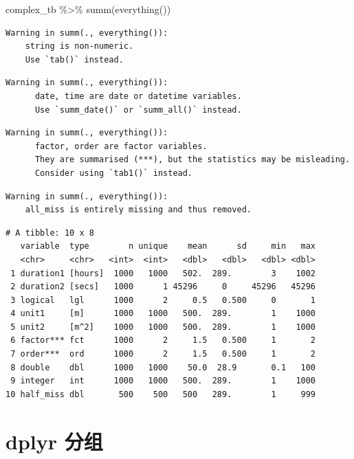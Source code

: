 \documentclass[
  letterpaper,
]{ctexbook}
\newenvironment{Shaded}{\begin{snugshade}}{\end{snugshade}}
\newcommand{\FunctionTok}[1]{\textcolor[rgb]{0.28,0.35,0.67}{#1}}
\newcommand{\NormalTok}[1]{\textcolor[rgb]{0.00,0.23,0.31}{#1}}
\newcommand{\SpecialCharTok}[1]{\textcolor[rgb]{0.37,0.37,0.37}{#1}}
\begin{document}
\begin{Shaded}
\begin{Highlighting}[]
\NormalTok{complex\_tb }\SpecialCharTok{\%\textgreater{}\%}
  \FunctionTok{summ}\NormalTok{(}\FunctionTok{everything}\NormalTok{())}
\end{Highlighting}
\end{Shaded}

\begin{verbatim}
Warning in summ(., everything()): 
    string is non-numeric.
    Use `tab()` instead.
\end{verbatim}

\begin{verbatim}
Warning in summ(., everything()): 
      date, time are date or datetime variables.
      Use `summ_date()` or `summ_all()` instead.
\end{verbatim}

\begin{verbatim}
Warning in summ(., everything()): 
      factor, order are factor variables.
      They are summarised (***), but the statistics may be misleading.
      Consider using `tab1()` instead.
\end{verbatim}

\begin{verbatim}
Warning in summ(., everything()): 
    all_miss is entirely missing and thus removed.
\end{verbatim}

\begin{verbatim}
# A tibble: 10 x 8
   variable  type        n unique    mean      sd     min   max
   <chr>     <chr>   <int>  <int>   <dbl>   <dbl>   <dbl> <dbl>
 1 duration1 [hours]  1000   1000   502.  289.        3    1002
 2 duration2 [secs]   1000      1 45296     0     45296   45296
 3 logical   lgl      1000      2     0.5   0.500     0       1
 4 unit1     [m]      1000   1000   500.  289.        1    1000
 5 unit2     [m^2]    1000   1000   500.  289.        1    1000
 6 factor*** fct      1000      2     1.5   0.500     1       2
 7 order***  ord      1000      2     1.5   0.500     1       2
 8 double    dbl      1000   1000    50.0  28.9       0.1   100
 9 integer   int      1000   1000   500.  289.        1    1000
10 half_miss dbl       500    500   500   289.        1     999
\end{verbatim}

\hypertarget{dplyr-ux5206ux7ec4}{%
\chapter{dplyr 分组}\label{dplyr-ux5206ux7ec4}}
\end{document}
